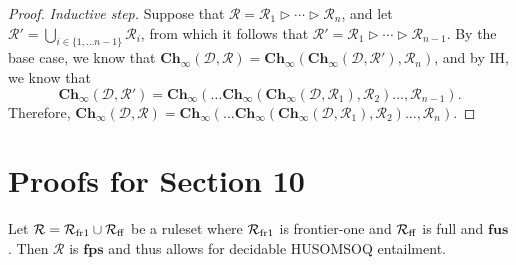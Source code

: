 \documentclass[10pt,a4paper]{amsart}
\theoremstyle{definition}
\numberwithin{equation}{section}
\providecommand{\sa}{\mathbf{Ch}_{\infty}}
\theoremstyle{plain}
\theoremstyle{definition}
\theoremstyle{myexample}
\theoremstyle{plain}
\newenvironment{customprop}[1]
  {\renewcommand\theinnercustomprop{#1}\innercustomprop}
  {\endinnercustomprop}
\theoremstyle{definition}
\newcommand{\database}{\mathcal{D}}
\newcommand{\db}{\database}
\newcommand{\cut}{\triangleright}
\newcommand{\ruleset}{\calr}
\newcommand{\fus}{\mathbf{fus}}
\newcommand{\fps}{\mathbf{fps}} %
\newcommand{\hcs}{\fps}
\newcommand{\fhcs}{\hcs}
\renewcommand{\sa}{\mathbf{Ch}_{\infty}}
\newcommand{\calr}{\mathcal{R}}
\begin{document}
\begin{proof}
\textit{Inductive step.} Suppose that $\ruleset = \ruleset_{1} \cut \cdots \cut \ruleset_{n}$, and let $\ruleset' = \bigcup_{i \in \{1, \ldots n-1\}} \ruleset_{i}$, from which it follows that $\ruleset' = \ruleset_{1} \cut \cdots \cut \ruleset_{n-1}$. By the base case, we know that $\sa(\db,\ruleset) = \sa(\sa(\db,\ruleset'),\ruleset_{n})$, and by IH, we know that $$\sa(\db,\ruleset') = \sa(\ldots\sa(\sa(\db,\ruleset_{1}),\ruleset_{2}) \ldots, \ruleset_{n-1}).$$Therefore, $\sa(\db,\ruleset) = \sa(\ldots\sa(\sa(\db,\ruleset_{1}),\ruleset_{2}) \ldots, \ruleset_{n}).$
\end{proof}

%

%




\section{Proofs for Section 10}\label{app:section-5-proofs}






\begin{customprop}{\ref{prop:frone-fusddl}}
Let $\ruleset = \ruleset_{\smash{\mathrm{fr1}}} \cup \ruleset_{\smash{\mathrm{ff}}}$ be a ruleset where $\ruleset_{\smash{\mathrm{fr1}}}$ is frontier-one and $\ruleset_{\smash{\mathrm{ff}}}$ is full and $\fus$. Then $\ruleset$ is $\fhcs$ and thus allows for decidable HUSOMSOQ entailment.  
\end{customprop}
\end{document}
